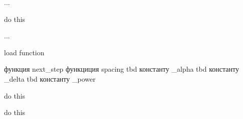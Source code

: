
\begin{DoxyRefList}
\item[\label{todo__todo000006}%
\Hypertarget{todo__todo000006}%
File \hyperlink{globaldefine_8h}{globaldefine.h} ]...  
\item[\label{todo__todo000008}%
\Hypertarget{todo__todo000008}%
Member \hyperlink{main_8cpp_ab68b0ca153dbee777accd1c361c55f89}{load} (\hyperlink{class_i_module}{I\+Module} $\ast$module)]do this  
\item[\label{todo__todo000009}%
\Hypertarget{todo__todo000009}%
Member \hyperlink{main_8cpp_a3c04138a5bfe5d72780bb7e82a18e627}{main} (int argc, char $\ast$$\ast$argv)]...  
\item[\label{todo__todo000007}%
\Hypertarget{todo__todo000007}%
File \hyperlink{main_8cpp}{main.cpp} ]load function  
\item[\label{todo__todo000001}%
\Hypertarget{todo__todo000001}%
Class \hyperlink{class_n_a_m_e_s_p_a_c_e_1_1_core}{N\+A\+M\+E\+S\+P\+A\+CE\+:\+:Core} ]функция next\+\_\+step функциция spacing tbd константу \+\_\+alpha tbd константу \+\_\+delta tbd константу \+\_\+power  
\item[\label{todo__todo000002}%
\Hypertarget{todo__todo000002}%
Member \hyperlink{class_n_a_m_e_s_p_a_c_e_1_1_core_a9aae5456022531811115080c388efdf4}{N\+A\+M\+E\+S\+P\+A\+CE\+:\+:Core\+:\+:acceleration} (\hyperlink{class_n_a_m_e_s_p_a_c_e_1_1_agent}{Agent} $\ast$first, \hyperlink{class_n_a_m_e_s_p_a_c_e_1_1_agent}{Agent} $\ast$second)]do this  
\item[\label{todo__todo000003}%
\Hypertarget{todo__todo000003}%
Member \hyperlink{class_n_a_m_e_s_p_a_c_e_1_1_core_a20d789ad96c8c29ec3568fd48bfe616b}{N\+A\+M\+E\+S\+P\+A\+CE\+:\+:Core\+:\+:next\+\_\+step} ()]do this 
\end{DoxyRefList}